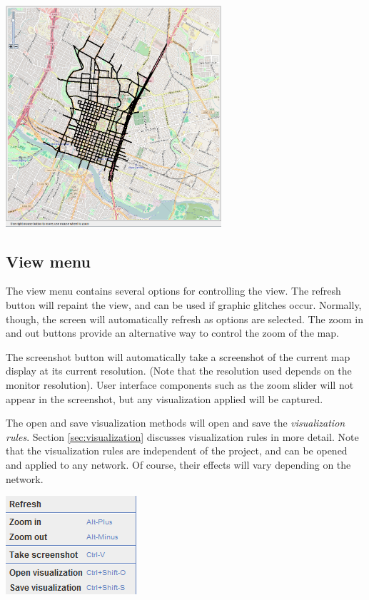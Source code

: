 \begin{center}
\includegraphics[width=0.6\textwidth]{images/editor4.png}
\end{center}

\subsection{View menu}
The view menu contains several options for controlling the view. The refresh button will repaint the view, and can be used if graphic glitches occur. Normally, though, the screen will automatically refresh as options are selected. The zoom in and out buttons provide an alternative way to control the zoom of the map.

The screenshot button will automatically take a screenshot of the current map display at its current resolution. (Note that the resolution used depends on the monitor resolution). User interface components such as the zoom slider will not appear in the screenshot, but any visualization applied will be captured.

The open and save visualization methods will open and save the \textit{visualization rules}. Section \ref{sec:visualization} discusses visualization rules in more detail. Note that the visualization rules are independent of the project, and can be opened and applied to any network. Of course, their effects will vary depending on the network.

\begin{center}
\includegraphics[scale=1]{images/editor3.png}
\end{center}

